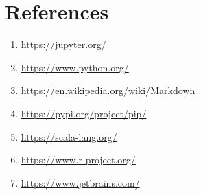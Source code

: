 \documentclass[pdftex,12pt]{artikel3}
\begin{document}
\newpage

\section{References}

\begin{enumerate}
\item
\url{https://jupyter.org/}
\item
\url{https://www.python.org/}
\item
\url{https://en.wikipedia.org/wiki/Markdown}
\item
\url{https://pypi.org/project/pip/}
\item
\url{https://scala-lang.org/}
\item
\url{https://www.r-project.org/}
\item
\url{https://www.jetbrains.com/}
\end{enumerate}

\newpage

\printindex
\end{document}
